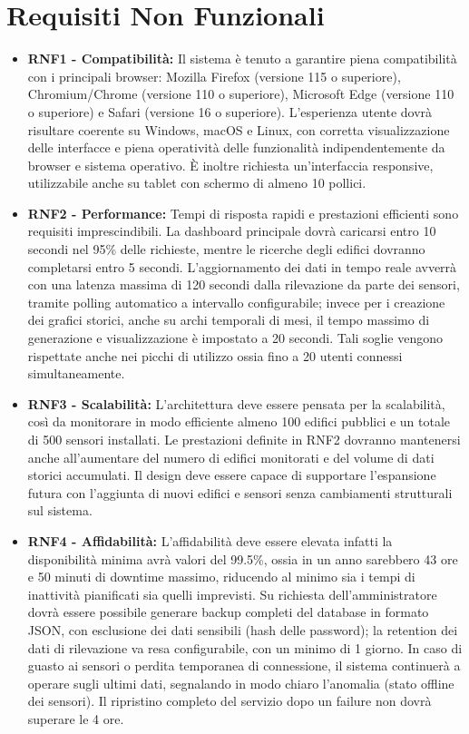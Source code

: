 \section{Requisiti Non Funzionali}
\begin{itemize}
    \item \textbf{RNF1 - Compatibilità:} Il sistema è tenuto a garantire piena compatibilità con i principali browser: Mozilla Firefox (versione 115 o superiore), Chromium/Chrome (versione 110 o superiore), Microsoft Edge (versione 110 o superiore) e Safari (versione 16 o superiore). L'esperienza utente dovrà risultare coerente su Windows, macOS e Linux, con corretta visualizzazione delle interfacce e piena operatività delle funzionalità indipendentemente da browser e sistema operativo. È inoltre richiesta un'interfaccia responsive, utilizzabile anche su tablet con schermo di almeno 10 pollici.

    \item \textbf{RNF2 - Performance:} Tempi di risposta rapidi e prestazioni efficienti sono requisiti imprescindibili. La dashboard principale dovrà caricarsi entro 10 secondi nel 95\% delle richieste, mentre le ricerche degli edifici dovranno completarsi entro 5 secondi. L'aggiornamento dei dati in tempo reale avverrà con una latenza massima di 120 secondi dalla rilevazione da parte dei sensori, tramite polling automatico a intervallo configurabile; invece per i creazione dei grafici storici, anche su archi temporali di mesi, il tempo massimo di generazione e visualizzazione è impostato a 20 secondi. Tali soglie vengono rispettate anche nei picchi di utilizzo ossia fino a 20 utenti connessi simultaneamente.

    \item \textbf{RNF3 - Scalabilità:} L'architettura deve essere pensata per la scalabilità, così da monitorare in modo efficiente almeno 100 edifici pubblici e un totale di 500 sensori installati. Le prestazioni definite in RNF2 dovranno mantenersi anche all'aumentare del numero di edifici monitorati e del volume di dati storici accumulati. Il design deve essere capace di supportare l'espansione futura con l'aggiunta di nuovi edifici e sensori senza cambiamenti strutturali sul sistema.

    \item \textbf{RNF4 - Affidabilità:} L'affidabilità deve essere elevata infatti la disponibilità minima avrà valori del 99.5\%, ossia in un anno sarebbero 43 ore e 50 minuti di downtime massimo, riducendo al minimo sia i tempi di inattività pianificati sia quelli imprevisti. Su richiesta dell'amministratore dovrà essere possibile generare backup completi del database in formato JSON, con esclusione dei dati sensibili (hash delle password); la retention dei dati di rilevazione va resa configurabile, con un minimo di 1 giorno. In caso di guasto ai sensori o perdita temporanea di connessione, il sistema continuerà a operare sugli ultimi dati, segnalando in modo chiaro l'anomalia (stato offline dei sensori). Il ripristino completo del servizio dopo un failure non dovrà superare le 4 ore.


\end{itemize}
